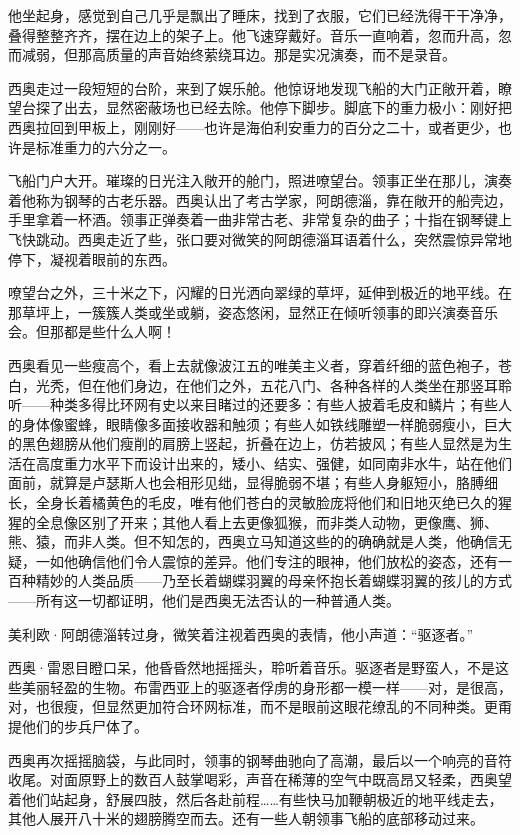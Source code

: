 \documentclass[AutoFakeBold=true]{book}
\begin{document}
他坐起身，感觉到自己几乎是飘出了睡床，找到了衣服，它们已经洗得干干净净，叠得整整齐齐，摆在边上的架子上。他飞速穿戴好。音乐一直响着，忽而升高，忽而减弱，但那高质量的声音始终萦绕耳边。那是实况演奏，而不是录音。

西奥走过一段短短的台阶，来到了娱乐舱。他惊讶地发现飞船的大门正敞开着，瞭望台探了出去，显然密蔽场也已经去除。他停下脚步。脚底下的重力极小：刚好把西奥拉回到甲板上，刚刚好——也许是海伯利安重力的百分之二十，或者更少，也许是标准重力的六分之一。

飞船门户大开。璀璨的日光注入敞开的舱门，照进嘹望台。领事正坐在那儿，演奏着他称为钢琴的古老乐器。西奥认出了考古学家，阿朗德淄，靠在敞开的船壳边，手里拿着一杯酒。领事正弹奏着一曲非常古老、非常复杂的曲子；十指在钢琴键上飞快跳动。西奥走近了些，张口要对微笑的阿朗德淄耳语着什么，突然震惊异常地停下，凝视着眼前的东西。

嘹望台之外，三十米之下，闪耀的日光洒向翠绿的草坪，延伸到极近的地平线。在那草坪上，一簇簇人类或坐或躺，姿态悠闲，显然正在倾听领事的即兴演奏音乐会。但那都是些什么人啊！

西奥看见一些瘦高个，看上去就像波江五的唯美主义者，穿着纤细的蓝色袍子，苍白，光秃，但在他们身边，在他们之外，五花八门、各种各样的人类坐在那竖耳聆听——种类多得比环网有史以来目睹过的还要多：有些人披着毛皮和鳞片；有些人的身体像蜜蜂，眼睛像多面接收器和触须；有些人如铁线雕塑一样脆弱瘦小，巨大的黑色翅膀从他们瘦削的肩膀上竖起，折叠在边上，仿若披风；有些人显然是为生活在高度重力水平下而设计出来的，矮小、结实、强健，如同南非水牛，站在他们面前，就算是卢瑟斯人也会相形见绌，显得脆弱不堪；有些人身躯短小，胳膊细长，全身长着橘黄色的毛皮，唯有他们苍白的灵敏脸庞将他们和旧地灭绝已久的猩猩的全息像区别了开来；其他人看上去更像狐猴，而非类人动物，更像鹰、狮、熊、猿，而非人类。但不知怎的，西奥立马知道这些的的确确就是人类，他确信无疑，一如他确信他们令人震惊的差异。他们专注的眼神，他们放松的姿态，还有一百种精妙的人类品质——乃至长着蝴蝶羽翼的母亲怀抱长着蝴蝶羽翼的孩儿的方式——所有这一切都证明，他们是西奥无法否认的一种普通人类。

美利欧·阿朗德淄转过身，微笑着注视着西奥的表情，他小声道：``驱逐者。''

西奥·雷恩目瞪口呆，他昏昏然地摇摇头，聆听着音乐。驱逐者是野蛮人，不是这些美丽轻盈的生物。布雷西亚上的驱逐者俘虏的身形都一模一样——对，是很高，对，也很瘦，但显然更加符合环网标准，而不是眼前这眼花缭乱的不同种类。更甭提他们的步兵尸体了。

西奥再次摇摇脑袋，与此同时，领事的钢琴曲驰向了高潮，最后以一个响亮的音符收尾。对面原野上的数百人鼓掌喝彩，声音在稀薄的空气中既高昂又轻柔，西奥望着他们站起身，舒展四肢，然后各赴前程……有些快马加鞭朝极近的地平线走去，其他人展开八十米的翅膀腾空而去。还有一些人朝领事飞船的底部移动过来。
\end{document}
